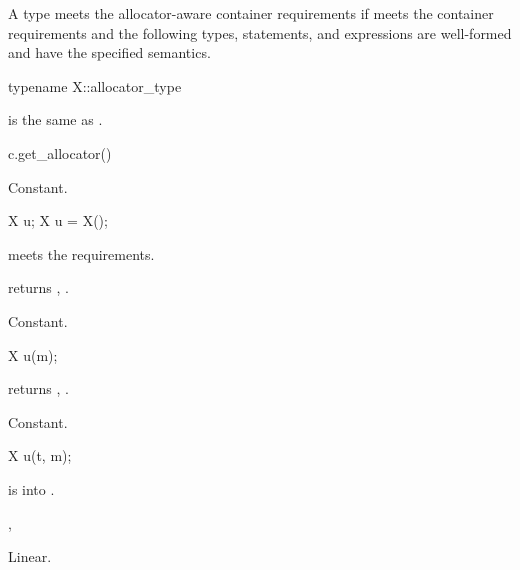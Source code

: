 A type  meets the allocator-aware container requirements
if  meets the container requirements and
the following types, statements, and expressions are well-formed and have
the specified semantics.

%
\begin{itemdecl}
typename X::allocator_type
\end{itemdecl}

\begin{itemdescr}
\pnum
\result
{}

\pnum
\mandates
{} is the same as .
\end{itemdescr}

%
\begin{itemdecl}
c.get_allocator()
\end{itemdecl}

\begin{itemdescr}
\pnum
\result
{}

\pnum
\complexity
Constant.
\end{itemdescr}

\begin{itemdecl}
X u;
X u = X();
\end{itemdecl}

\begin{itemdescr}
\pnum
\expects
{} meets the  requirements.

\pnum
\ensures
{} returns , .

\pnum
\complexity
Constant.
\end{itemdescr}

\begin{itemdecl}
X u(m);
\end{itemdecl}

\begin{itemdescr}
\pnum
\ensures
{} returns , .

\pnum
\complexity
Constant.
\end{itemdescr}

\begin{itemdecl}
X u(t, m);
\end{itemdecl}

\begin{itemdescr}
\pnum
\expects
{} is  into .

\pnum
\ensures
{}, 

\pnum
\complexity
Linear.
\end{itemdescr}

